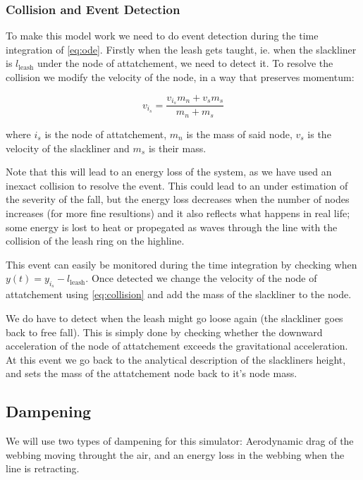 \documentclass[a4paper,10pt]{article}
\begin{document}
\subsubsection{Collision and Event Detection}%
\label{ssub:event_detection}
To make this model work we need to do event detection during the time integration of \eqref{eq:ode}. Firstly when the leash gets taught, ie. when the slackliner is $l_\text{leash
}$ under the node of attatchement, we need to detect it. To resolve the collision we modify the velocity of the node, in a way that preserves momentum:

\begin{equation}
   \label{eq:collision}
   v_{i_s} = \frac{v_{i_s} m_n + v_s m_s}{m_n + m_s}
\end{equation}

where $i_s$ is the node of attatchement, $m_n$ is the mass of said node, $v_s$ is the velocity of the slackliner and $m_s$ is their mass.

Note that this will lead to an energy loss of the system, as we have used an inexact collision to resolve the event. This could lead to an under estimation of the severity of the fall, but the energy loss decreases when the number of nodes increases (for more fine resultions) and it also reflects what happens in real life; some energy is lost to heat or propegated as waves through the line with the collision of the leash ring on the highline.

This event can easily be monitored during the time integration by checking when $y(t) = y_{i_s} - l_\text{leash}$. Once detected we change the velocity of the node of attatchement using \eqref{eq:collision} and add the mass of the slackliner to the node.

We do have to detect when the leash might go loose again (the slackliner goes back to free fall). This is simply done by checking whether the downward acceleration of the node of attatchement exceeds the gravitational acceleration. At this event we go back to the analytical description of the slackliners height, and sets the mass of the attatchement node back to it's node mass.

\subsection{Dampening}%
\label{sub:dampening}

We will use two types of dampening for this simulator: Aerodynamic drag of the webbing moving throught the air, and an energy loss in the webbing when the line is retracting.
\end{document}
